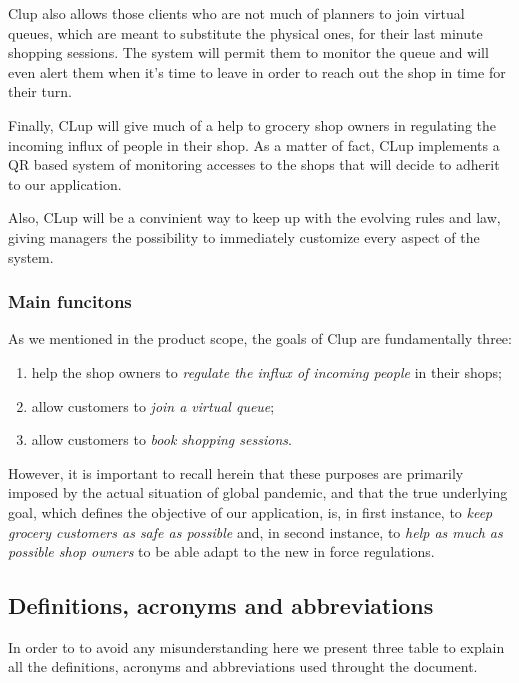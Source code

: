 Clup also allows those clients who are not much of planners to join virtual queues, which are meant to substitute the physical ones, for their last minute shopping sessions. The system will permit them to monitor the queue and will even alert them when it’s time to leave in order to reach out the shop in time for their turn.

Finally, CLup will give much of a help to grocery shop owners in regulating the incoming influx of people in their shop. As a matter of fact, CLup implements a QR based system of monitoring accesses to the shops that will decide to adherit to our application. 

Also, CLup will be a convinient way to keep up with the evolving rules and law, giving managers the possibility to immediately customize every aspect of the system.

\subsubsection{Main funcitons}
\label{subsect:mainfunctions}

As we mentioned in the product scope, the goals of Clup are fundamentally three: 
\begin{enumerate}[topsep=0pt]
    \item help the shop owners to \textit{regulate the influx of incoming people} in their shops;
    \item allow customers to \textit{join a virtual queue};
    \item allow customers to \textit{book shopping sessions}.
\end{enumerate}

However, it is important to recall herein that these purposes are primarily imposed by the actual situation of global pandemic, and that the true underlying goal, which defines the objective of our application, is, in first instance, to \textit{keep grocery customers as safe as possible} and, in second instance, to \textit{help as much as possible shop owners} to be able adapt to the new in force regulations.

\subsection{Definitions, acronyms and abbreviations}
\label{subsect:definitionsacronymsabbreviations}

In order to to avoid any misunderstanding here we present three table to explain all the definitions, acronyms and abbreviations used throught the document.


